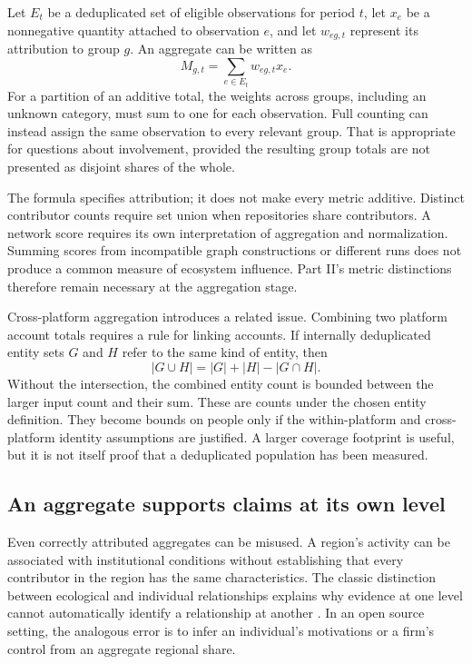 Let \(E_t\) be a deduplicated set of eligible observations for period \(t\), let \(x_e\) be a nonnegative quantity attached to observation \(e\), and let \(w_{eg,t}\) represent its attribution to group \(g\). An aggregate can be written as
\begin{equation}
 M_{g,t}=\sum_{e\in E_t}w_{eg,t}x_e.
 \label{eq:ch9-aggregation}
\end{equation}
For a partition of an additive total, the weights across groups, including an unknown category, must sum to one for each observation. Full counting can instead assign the same observation to every relevant group. That is appropriate for questions about involvement, provided the resulting group totals are not presented as disjoint shares of the whole.

The formula specifies attribution; it does not make every metric additive. Distinct contributor counts require set union when repositories share contributors. A network score requires its own interpretation of aggregation and normalization. Summing scores from incompatible graph constructions or different runs does not produce a common measure of ecosystem influence. Part II's metric distinctions therefore remain necessary at the aggregation stage.

Cross-platform aggregation introduces a related issue. Combining two platform account totals requires a rule for linking accounts. If internally deduplicated entity sets \(G\) and \(H\) refer to the same kind of entity, then
\[
 |G\cup H|=|G|+|H|-|G\cap H|.
\]
Without the intersection, the combined entity count is bounded between the larger input count and their sum. These are counts under the chosen entity definition. They become bounds on people only if the within-platform and cross-platform identity assumptions are justified. A larger coverage footprint is useful, but it is not itself proof that a deduplicated population has been measured.

\subsection{An aggregate supports claims at its own level}
Even correctly attributed aggregates can be misused. A region's activity can be associated with institutional conditions without establishing that every contributor in the region has the same characteristics. The classic distinction between ecological and individual relationships explains why evidence at one level cannot automatically identify a relationship at another \citep{robinson1950}. In an open source setting, the analogous error is to infer an individual's motivations or a firm's control from an aggregate regional share.

